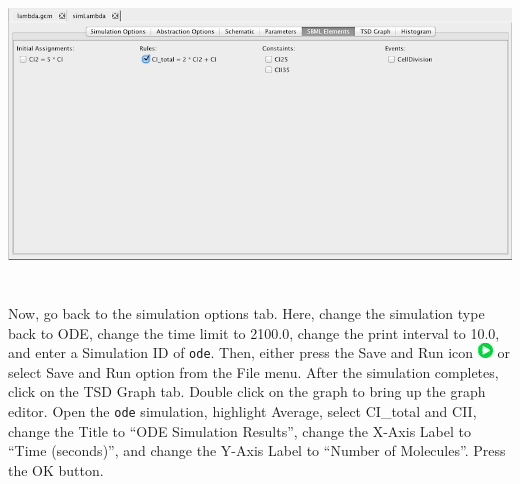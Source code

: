 \documentclass[titlepage,11pt]{article}
\begin{document}
\begin{center}
\includegraphics[height=80mm]{screenshots/SBMLElements}
\end{center}

Now, go back to the simulation options tab.  Here, change the simulation type back to ODE, change the time limit to 2100.0, change the print interval to 10.0, and enter a Simulation ID of {\tt ode}.  Then, either press the Save and Run icon \includegraphics{../gui/icons/run-icon} or select Save and Run option from the File menu.
After the simulation completes, click on the TSD Graph tab.  Double click on the graph to bring up the graph editor.
Open the {\tt ode} simulation, highlight Average, select CI\_total and CII, change the Title to ``ODE Simulation Results'', change the X-Axis Label to ``Time (seconds)'', and change the Y-Axis Label to ``Number of Molecules''.  
Press the OK button.  
 
\end{document}
